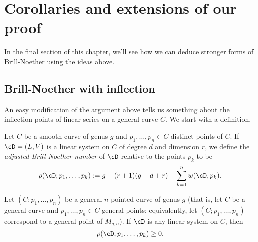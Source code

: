 \section{Corollaries and extensions of our proof}

 In the final section of this chapter, we'll see how we can deduce stronger forms of Brill-Noether using the ideas above.

\subsection{Brill-Noether with inflection}


An easy modification of the argument above tells us something about the inflection points of linear series on a general curve $C$. We start with a definition.

\begin{definition}
Let $C$ be a smooth curve of genus $g$ and $p_1,\dots,p_n \in C$ distinct points of $C$. If $\cD = (L,V)$ is a linear system on $C$ of degree $d$ and dimension $r$, we define the \emph{adjusted Brill-Noether number} of $\cD$ relative to the points $p_k$ to be
$$
\rho(\cD; p_1,\dots,p_k) := g - (r+1)(g-d+r) - \sum_{k=1}^n w(\cD,p_k).
$$
\end{definition}

\begin{theorem}\label{Brill-Noether with inflection}
Let $(C;p_1,\dots,p_n)$ be a general $n$-pointed curve of genus $g$ (that is, let $C$ be a general curve and $p_1,\dots,p_n \in C$ general points; equivalently, let $(C;p_1,\dots,p_n)$ correspond to a general point of $M_{g,n}$). If $\cD$ is any linear system on $C$, then
$$
\rho(\cD; p_1,\dots,p_k) \geq 0.
$$
\end{theorem}

